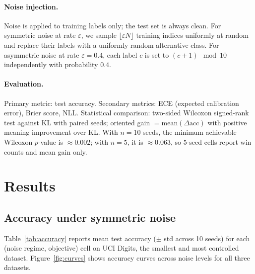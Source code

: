 \documentclass[11pt]{article}
\begin{document}
\paragraph{Noise injection.}
Noise is applied to training labels only; the test set is always clean.
For symmetric noise at rate $\varepsilon$, we sample $\lfloor \varepsilon N
\rfloor$ training indices uniformly at random and replace their labels with a
uniformly random alternative class.
For asymmetric noise at rate $\varepsilon = 0.4$, each label $c$ is set to
$(c+1)\!\mod 10$ independently with probability $0.4$.

\paragraph{Evaluation.}
Primary metric: test accuracy.
Secondary metrics: ECE (expected calibration error), Brier score, NLL.
Statistical comparison: two-sided Wilcoxon signed-rank test against KL with
paired seeds; oriented gain $= \mathrm{mean}(\Delta\mathrm{acc})$ with positive
meaning improvement over KL.
With $n=10$ seeds, the minimum achievable Wilcoxon $p$-value is $\approx 0.002$;
with $n=5$, it is $\approx 0.063$, so 5-seed cells report win counts and mean
gain only.

\section{Results}

\subsection{Accuracy under symmetric noise}

Table~\ref{tab:accuracy} reports mean test accuracy ($\pm$ std across 10 seeds)
for each (noise regime, objective) cell on UCI Digits, the smallest and most
controlled dataset.
Figure~\ref{fig:curves} shows accuracy curves across noise levels for all three
datasets.
\end{document}

